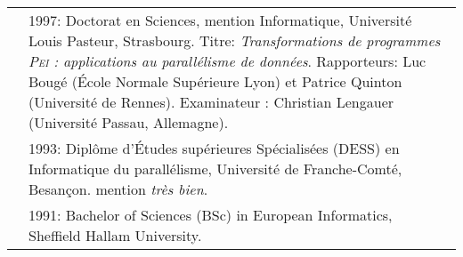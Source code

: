 \begin{tabular}{lp{13.7cm}}
%
			& 1997:  Doctorat en Sciences, mention Informatique, Université Louis Pasteur, Strasbourg.
      			  Titre: {\em Transformations de programmes \textsc{Pei} : applications au parall\'{e}lisme de donn\'{e}es}.
		              Rapporteurs: Luc Bougé (\'{E}cole Normale Supérieure Lyon) et Patrice Quinton (Université de Rennes). Examinateur : Christian Lengauer (Université Passau, Allemagne).\\[2mm]
			& 1993: Diplôme d'\'{E}tudes supérieures Spécialisées (DESS) en Informatique du parallélisme, 
				Université de Franche-Comté, Besançon. mention {\em très bien}.\\[2mm]
			& 1991: Bachelor of Sciences (BSc) in European Informatics, Sheffield Hallam University.\\[5mm]

\end{tabular}



